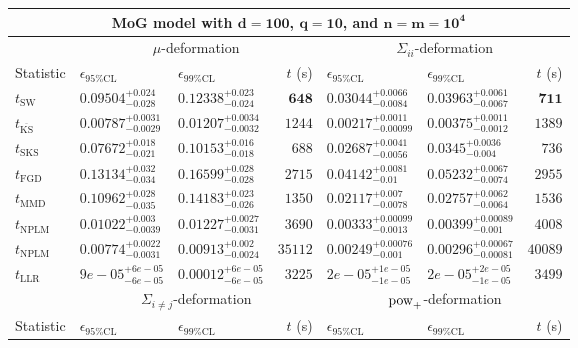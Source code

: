 \begin{tabular}{l|llr|llr}
	\toprule
	\multicolumn{7}{c}{{\bf MoG model with $\mathbf{d=100}$, $\mathbf{q=10}$, and $\mathbf{n=m=10^{4}}$}} \\
	\toprule
	\multicolumn{1}{c}{} & \multicolumn{3}{c}{$\mu$-deformation} & \multicolumn{3}{c}{$\Sigma_{ii}$-deformation} \\
	Statistic & $\epsilon_{95\%\mathrm{CL}}$ & $\epsilon_{99\%\mathrm{CL}}$ & $t$ (s) & $\epsilon_{95\%\mathrm{CL}}$ & $\epsilon_{99\%\mathrm{CL}}$ & $t$ (s) \\
	\midrule
	$t_{\mathrm{SW}}$ & $0.09504_{-0.028}^{+0.024}$ & $0.12338_{-0.024}^{+0.023}$ & ${\mathbf{648}}$ & $0.03044_{-0.0084}^{+0.0066}$ & $0.03963_{-0.0067}^{+0.0061}$ & ${\mathbf{711}}$ \\
	$t_{\overline{\mathrm{KS}}}$ & ${\mathbf{0.00787_{-0.0029}^{+0.0031}}}$ & ${\mathbf{0.01207_{-0.0032}^{+0.0034}}}$ & $1244$ & ${\mathbf{0.00217_{-0.00099}^{+0.0011}}}$ & ${\mathbf{0.00375_{-0.0012}^{+0.0011}}}$ & $1389$ \\
	$t_{\mathrm{SKS}}$ & $0.07672_{-0.021}^{+0.018}$ & $0.10153_{-0.018}^{+0.016}$ & $688$ & $0.02687_{-0.0056}^{+0.0041}$ & $0.0345_{-0.004}^{+0.0036}$ & $736$ \\
	$t_{\mathrm{FGD}}$ & $0.13134_{-0.034}^{+0.032}$ & $0.16599_{-0.028}^{+0.028}$ & $2715$ & $0.04142_{-0.01}^{+0.0081}$ & $0.05232_{-0.0074}^{+0.0067}$ & $2955$ \\
	$t_{\mathrm{MMD}}$ & $0.10962_{-0.035}^{+0.028}$ & $0.14183_{-0.026}^{+0.023}$ & $1350$ & $0.02117_{-0.0078}^{+0.007}$ & $0.02757_{-0.0064}^{+0.0062}$ & $1536$ \\
\rowcolor{red!35}	$t_{\mathrm{NPLM}}$ & $0.01022_{-0.0039}^{+0.003}$ & $0.01227_{-0.0031}^{+0.0027}$ & $3690$ & $0.00333_{-0.0013}^{+0.00099}$ & $0.00399_{-0.001}^{+0.00089}$ & $4008$ \\
\rowcolor{blue!35}	$t_{\mathrm{NPLM}}$ & $0.00774_{-0.0031}^{+0.0022}$ & $0.00913_{-0.0024}^{+0.002}$ & $35112$ & $0.00249_{-0.001}^{+0.00076}$ & $0.00296_{-0.00081}^{+0.00067}$ & $40089$ \\
	$t_{\mathrm{LLR}}$ & $9e-05_{-6e-05}^{+6e-05}$ & $0.00012_{-6e-05}^{+6e-05}$ & $3225$ & $2e-05_{-1e-05}^{+1e-05}$ & $2e-05_{-1e-05}^{+2e-05}$ & $3499$ \\
	\toprule
	\multicolumn{1}{c}{} & \multicolumn{3}{c}{$\Sigma_{i\neq j}$-deformation} & \multicolumn{3}{c}{$\rm{pow}_{+}$-deformation} \\
	Statistic & $\epsilon_{95\%\mathrm{CL}}$ & $\epsilon_{99\%\mathrm{CL}}$ & $t$ (s) & $\epsilon_{95\%\mathrm{CL}}$ & $\epsilon_{99\%\mathrm{CL}}$ & $t$ (s) \\

\end{tabular}

